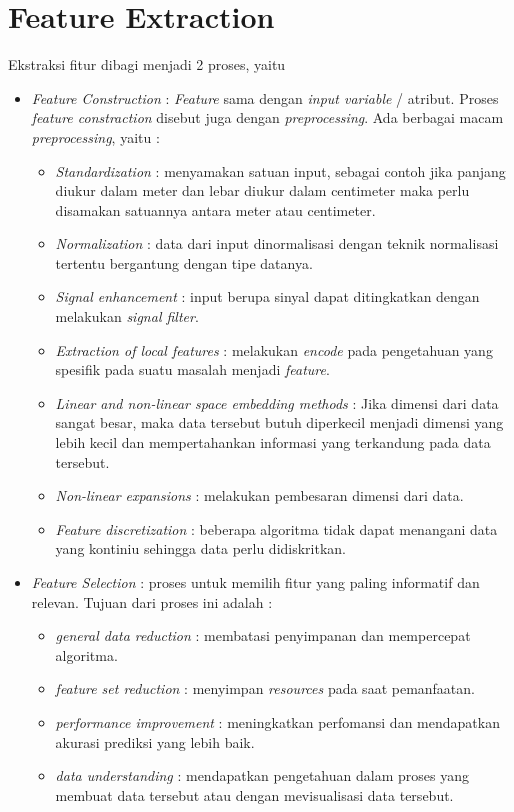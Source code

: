 \section{Feature Extraction \cite{isabelle:0:extractionFeature}}
\label{sec:fE}
Ekstraksi fitur dibagi menjadi 2 proses, yaitu 
\begin{itemize}
	\item {\it Feature Construction} : {\it Feature} sama dengan {\it input variable} / atribut. Proses {\it feature constraction} disebut juga dengan {\it preprocessing}. Ada berbagai macam {\it preprocessing}, yaitu :
	\begin{itemize}
		\item {\it Standardization} : menyamakan satuan input, sebagai contoh jika panjang diukur dalam meter dan lebar diukur dalam centimeter maka perlu disamakan satuannya antara meter atau centimeter.
		\item {\it Normalization} : data dari input dinormalisasi dengan teknik normalisasi tertentu bergantung dengan tipe datanya.
		\item {\it Signal enhancement} : input berupa sinyal dapat ditingkatkan dengan melakukan {\it signal filter}.
		\item {\it Extraction of local features} : melakukan {\it encode} pada pengetahuan yang spesifik pada suatu masalah menjadi {\it feature}.
		\item {\it Linear and non-linear space embedding methods} : Jika dimensi dari data sangat besar, maka data tersebut butuh diperkecil menjadi dimensi yang lebih kecil dan mempertahankan informasi yang terkandung pada data tersebut.
		\item {\it Non-linear expansions} : melakukan pembesaran dimensi dari data.
		\item {\it Feature discretization} : beberapa algoritma tidak dapat menangani data yang kontiniu sehingga data perlu didiskritkan.
	\end{itemize}
	\item {\it Feature Selection} : proses untuk memilih fitur yang paling informatif dan relevan. Tujuan dari proses ini adalah :
	\begin{itemize}
		\item {\it general data reduction} : membatasi penyimpanan dan mempercepat algoritma.
		\item {\it feature set reduction} : menyimpan {\it resources} pada saat pemanfaatan.
		\item {\it performance improvement} : meningkatkan perfomansi dan mendapatkan akurasi prediksi yang lebih baik.
		\item {\it data understanding} : mendapatkan pengetahuan dalam proses yang membuat data tersebut atau dengan mevisualisasi data tersebut.
	\end{itemize}
\end{itemize}

